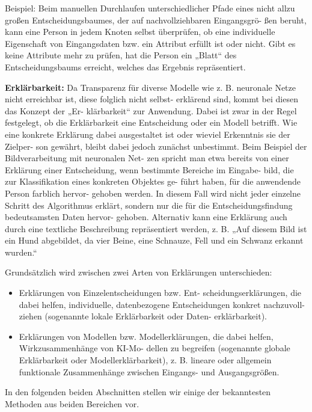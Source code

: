 \documentclass[11pt,a4paper]{article}
\numberwithin{equation}{section}
\begin{document}
	Beispiel: Beim manuellen
	Durchlaufen unterschiedlicher
	Pfade eines nicht allzu großen
	Entscheidungsbaumes, der auf
	nachvollziehbaren Eingangsgrö-
	ßen beruht, kann eine Person in
	jedem Knoten selbst überprüfen,
	ob eine individuelle Eigenschaft
	von Eingangsdaten bzw. ein Attribut erfüllt ist oder nicht.
	Gibt es keine Attribute mehr zu prüfen, hat die Person
	ein „Blatt“ des Entscheidungsbaums erreicht, welches
	das Ergebnis repräsentiert. 
	
	\noindent \textbf{Erklärbarkeit: }Da Transparenz für diverse Modelle wie z. B. neuronale
	Netze nicht erreichbar ist, diese folglich nicht selbst-
	erklärend sind, kommt bei diesen das Konzept der „Er-
	klärbarkeit“ zur Anwendung. Dabei ist zwar in der Regel
	festgelegt, ob die Erklärbarkeit eine Entscheidung oder
	ein Modell betrifft. Wie eine konkrete Erklärung dabei
	ausgestaltet ist oder wieviel Erkenntnis sie der Zielper-
	son gewährt, bleibt dabei jedoch zunächst unbestimmt.
	Beim Beispiel der Bildverarbeitung mit neuronalen Net-
	zen spricht man etwa bereits von einer Erklärung einer
	Entscheidung, wenn bestimmte Bereiche im Eingabe-
	bild, die zur Klassifikation eines konkreten Objektes ge-
	führt haben, für die anwendende Person farblich hervor-
	gehoben werden. In diesem Fall wird nicht jeder einzelne
	Schritt des Algorithmus erklärt, sondern nur die für die
	Entscheidungsfindung bedeutsamsten Daten hervor-
	gehoben. Alternativ kann eine Erklärung auch durch eine
	textliche Beschreibung repräsentiert werden, z. B. „Auf
	diesem Bild ist ein Hund abgebildet, da vier Beine, eine
	Schnauze, Fell und ein Schwanz erkannt wurden.“
	
	Grundsätzlich wird zwischen zwei Arten von Erklärungen unterschieden:
	
	\begin{itemize}
		\item Erklärungen von Einzelentscheidungen bzw. Ent-
		scheidungserklärungen, die dabei helfen, individuelle,
		datenbezogene Entscheidungen konkret nachzuvoll-
		ziehen (sogenannte lokale Erklärbarkeit oder Daten-
		erklärbarkeit).
		\item Erklärungen von Modellen bzw. Modellerklärungen,
		die dabei helfen, Wirkzusammenhänge von KI-Mo-
		dellen zu begreifen (sogenannte globale Erklärbarkeit
		oder Modellerklärbarkeit), z. B. lineare oder allgemein
		funktionale Zusammenhänge zwischen Eingangs-
		und Ausgangsgrößen.
	\end{itemize}

In den folgenden beiden Abschnitten stellen wir einige der bekanntesten Methoden aus beiden Bereichen vor.
\end{document}
